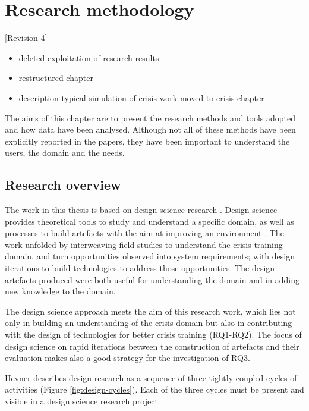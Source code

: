 \chapter{Research methodology}\label{research}

{[}Revision 4{]}

\begin{itemize}
\itemsep1pt\parskip0pt
\item
  deleted exploitation of research results
\item
  restructured chapter
\item
  description typical simulation of crisis work moved to crisis chapter
\end{itemize}

The aims of this chapter are to present the research methods and tools
adopted and how data have been analysed. Although not all of these
methods have been explicitly reported in the papers, they have been
important to understand the users, the domain and the needs.

\section{Research overview}\label{research-overview}

The work in this thesis is based on design science research
\autocites{Hevner:2010fy}{March:1995gm}. Design science provides
theoretical tools to study and understand a specific domain, as well as
processes to build artefacts with the aim at improving an environment
\autocite{simon1996sciences}. The work unfolded by interweaving field
studies to understand the crisis training domain, and turn opportunities
observed into system requirements; with design iterations to build
technologies to address those opportunities. The design artefacts
produced were both useful for understanding the domain and in adding new
knowledge to the domain.

The design science approach meets the aim of this research work, which
lies not only in building an understanding of the crisis domain but also
in contributing with the design of technologies for better crisis
training (RQ1-RQ2). The focus of design science on rapid iterations
between the construction of artefacts and their evaluation
\autocite{Hevner:2010gc} makes also a good strategy for the
investigation of RQ3.

Hevner \autocites{Havner2004}{hevner2007three} describes design research
as a sequence of three tightly coupled cycles of activities (Figure
\ref{fig:design-cycles}). Each of the three cycles must be present and
visible in a design science research project \autocite{Hevner:2010gc}.

